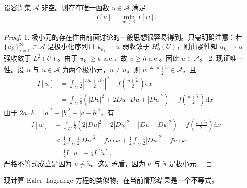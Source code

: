 \documentclass[../../main.tex]{subfiles}
\begin{document}
\begin{theorem}[极小元的存在性]\label{theorem:ch08-4-3-障碍存在唯一}
设容许集 $\mathcal{A}$ 非空。则存在唯一函数 $u\in\mathcal{A}$ 满足
\begin{align*}
I[u]=\min_{w\in\mathcal{A}}I[w].
\end{align*}
\begin{proof}
1. 极小元的存在性由前面讨论的一般思想很容易得到。只需明确注意：若 $\{u_{k_j}\}_{j=1}^\infty\subset\mathcal{A}$ 是极小化序列且 $u_{k_j}\rightharpoonup u$ 弱收敛于 $H_0^1(U)$，则由紧性知 $u_{k_j}\to u$ 强收敛于 $L^2(U)$。由于 $u_{k_j}\geqslant h$ a.e.，故 $u\geqslant h$ a.e.。因此 $u\in\mathcal{A}$。
2. 现证唯一性。设 $u$ 与 $\widetilde{u}\in\mathcal{A}$ 为两个极小元，$u\neq\widetilde{u}$。则 $w\triangleq\frac{u+\widetilde{u}}2\in\mathcal{A}$，且
\begin{align*}
I[w]&=\int_U\frac12\left|\frac{Du+D\widetilde{u}}2\right|^2-f\!\left(\frac{u+\widetilde{u}}2\right)\mathrm{d}x\\
&=\int_U\frac18(|Du|^2+2Du\cdot D\widetilde{u}+|D\widetilde{u}|^2)-f\!\left(\frac{u+\widetilde{u}}2\right)\mathrm{d}x.
\end{align*}
由于 $2a\cdot b=|a|^2+|b|^2-|a-b|^2$，有
\begin{align*}
I[w]&=\int_U\frac18(2|Du|^2+2|D\widetilde{u}|^2-|Du-D\widetilde{u}|^2)-f\!\left(\frac{u+\widetilde{u}}2\right)\mathrm{d}x\\
&<\frac12\int_U\frac12|Du|^2-fu\,\mathrm{d}x+\frac12\int_U\frac12|D\widetilde{u}|^2-f\widetilde{u}\,\mathrm{d}x\\
&=\frac12 I[u]+\frac12 I[\widetilde{u}],
\end{align*}
严格不等式成立是因为 $u\not\equiv\widetilde{u}$。这是矛盾，因为 $u$ 与 $\widetilde{u}$ 是极小元。
\end{proof}
\end{theorem}

现计算 Euler--Lagrange 方程的类似物，在当前情形结果是一个不等式。
\end{document}
